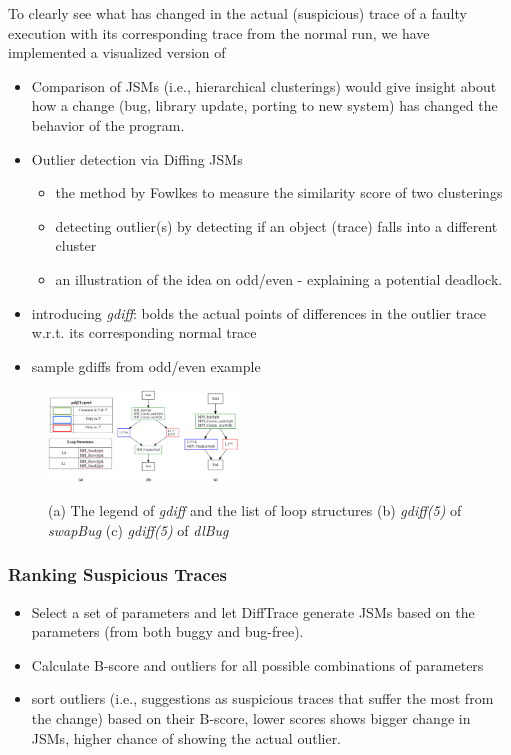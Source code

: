 To clearly see what has changed in the actual (suspicious) trace of a faulty execution with its corresponding trace from the normal run, we have implemented a visualized version of 

\begin{itemize}
	\item Comparison of JSMs (i.e., hierarchical clusterings) would give insight about how a change (bug, library update, porting to new system) has changed the behavior of the program.
	\item Outlier detection via Diffing JSMs
	\begin{itemize}
		\item the method by Fowlkes to measure the similarity score of two clusterings
		\item detecting outlier(s) by detecting if an object (trace) falls into a different cluster 
		\item an illustration of the idea on odd/even - explaining a potential deadlock.
	\end{itemize}
	\item introducing \textit{gdiff}: bolds the actual points of differences in the outlier trace w.r.t. its corresponding normal trace
	\item sample gdiffs from odd/even example
	
\end{itemize}

\begin{figure}[]
\centering
\caption{(a) The legend of \textit{gdiff} and the list of loop structures (b) \textit{gdiff(5)} of \textit{swapBug} (c) \textit{gdiff(5)} of \textit{dlBug}}
\includegraphics[width=0.45\textwidth]{figs/sampleGdiff.png}
\label{fig.gdiffs}
\end{figure}



\subsubsection{Ranking Suspicious Traces}
\begin{itemize}
	\item Select a set of parameters and let DiffTrace generate JSMs based on the parameters (from both buggy and bug-free).
	\item Calculate B-score and outliers for all possible combinations of parameters
	\item sort outliers (i.e., suggestions as suspicious traces that suffer the most from the change) based on their B-score, lower scores shows bigger change in JSMs, higher chance of showing the actual outlier.
\end{itemize}

